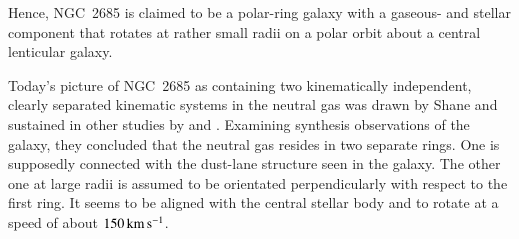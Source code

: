 \documentclass[oldversion]{aa}
\begin{document}
%
%
Hence, NGC~2685 is claimed to be a polar-ring galaxy with a gaseous-
and stellar component that rotates at rather small radii on a polar
orbit about a central lenticular galaxy.

Today's picture of NGC~2685 as containing two kinematically
independent, clearly separated kinematic systems in the neutral gas
was drawn by Shane \citeyearpar{Shane77,Shane80} and sustained in
other studies by \citet[][]{Mahon92} and
\citet[][]{Schinnerer02}. Examining  synthesis observations
of the galaxy, they concluded that the neutral gas resides in two
separate rings. One is supposedly connected with the dust-lane
structure seen in the galaxy. The other one at large radii is assumed
to be orientated perpendicularly with respect to the first ring. It
seems to be aligned with the central stellar body and to rotate at a
speed of about $150\,{\rm km}\,{\rm s}^{-1}$.
\end{document}
